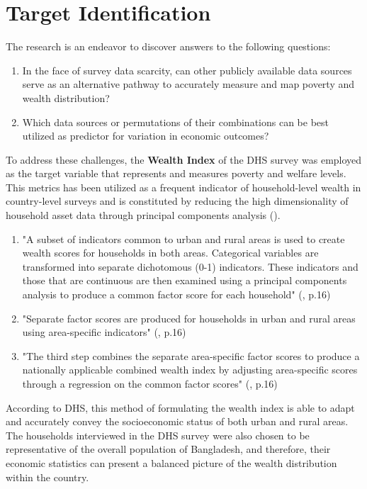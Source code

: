 \documentclass[solid,math,chem,code,plot,gloss]{bmc}
\begin{document}
\section{Target Identification}

The research is an endeavor to discover answers to the following questions:

\begin{enumerate}
    \item In the face of survey data scarcity, can other publicly available data sources serve as an alternative pathway to accurately measure and map poverty and wealth distribution?
    \item Which data sources or permutations of their combinations can be best utilized as predictor for variation in economic outcomes? 
\end{enumerate}

To address these challenges, the \textbf{Wealth Index} of the DHS survey was employed as the target variable that represents and measures poverty and welfare levels. This metrics has been utilized as a frequent indicator of household-level wealth in country-level surveys and is constituted by reducing the high dimensionality of household asset data through principal components analysis (\cite{Rutstein}).

\begin{example}
    \begin{enumerate}
        \item "A subset of indicators common to urban and rural areas is used to create wealth scores for households in both areas. Categorical variables are transformed into separate dichotomous (0-1) indicators. These indicators and those that are continuous are then examined using a principal components analysis to produce a common factor score for each household" (\cite{dhs_2014}, p.16)
        \item "Separate factor scores are produced for households in urban and rural areas using area-specific indicators" (\cite{dhs_2014}, p.16)
        \item "The third step combines the separate area-specific factor scores to produce a nationally applicable combined wealth index by adjusting area-specific scores through a regression on the common factor scores" (\cite{dhs_2014}, p.16)
    \end{enumerate}
\end{example}

According to DHS, this method of formulating the wealth index is able to adapt and accurately convey the socioeconomic status of both urban and rural areas. The households interviewed in the DHS survey were also chosen to be representative of the overall population of Bangladesh, and therefore, their economic statistics can present a balanced picture of the wealth distribution within the country.
\end{document}
